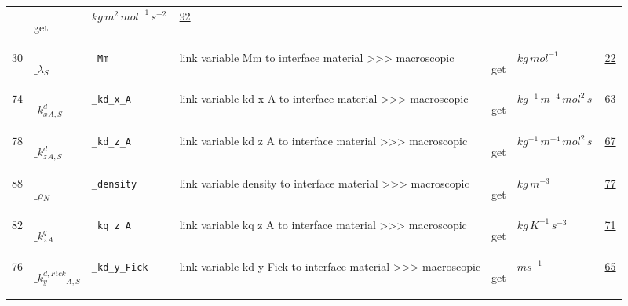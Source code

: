 \begin{longtable}{|p{1cm}|p{2.5cm}|p{4.5cm}|p{8cm}|p{3.0cm}|p{3cm}|p{1cm}|}
             & \begin{lay}get \end{lay}
             & $ kg \,m^{2} \,mol^{-1} \,s^{-2} \, $
             &                 \hyperlink{"e:92"}{ 92 }
                 \\
            30
             & \hypertarget{"v:30"}{ $ {{\_\lambda}}{_{S}} $}
             & \verb|_Mm|
             & link variable Mm to interface material >>> macroscopic
             & \begin{lay}get \end{lay}
             & $ kg \,mol^{-1} \, $
             &                 \hyperlink{"e:22"}{ 22 }
                 \\
            74
             & \hypertarget{"v:74"}{ $ {{\_k^d_x}}{_{A, S}} $}
             & \verb|_kd_x_A|
             & link variable kd x A to interface material >>> macroscopic
             & \begin{lay}get \end{lay}
             & $ kg^{-1} \,m^{-4} \,mol^{2} \,s \, $
             &                 \hyperlink{"e:63"}{ 63 }
                 \\
            78
             & \hypertarget{"v:78"}{ $ {{\_k^d_z}}{_{A, S}} $}
             & \verb|_kd_z_A|
             & link variable kd z A to interface material >>> macroscopic
             & \begin{lay}get \end{lay}
             & $ kg^{-1} \,m^{-4} \,mol^{2} \,s \, $
             &                 \hyperlink{"e:67"}{ 67 }
                 \\
            88
             & \hypertarget{"v:88"}{ $ {{\_\rho}}{_{N}} $}
             & \verb|_density|
             & link variable density to interface material >>> macroscopic
             & \begin{lay}get \end{lay}
             & $ kg \,m^{-3} \, $
             &                 \hyperlink{"e:77"}{ 77 }
                 \\
            82
             & \hypertarget{"v:82"}{ $ {{\_k^q_z}}{_{A}} $}
             & \verb|_kq_z_A|
             & link variable kq z A to interface material >>> macroscopic
             & \begin{lay}get \end{lay}
             & $ kg \,K^{-1} \,s^{-3} \, $
             &                 \hyperlink{"e:71"}{ 71 }
                 \\
            76
             & \hypertarget{"v:76"}{ $ {{\_k^{d,Fick}_y}}{_{A, S}} $}
             & \verb|_kd_y_Fick|
             & link variable kd y Fick to interface material >>> macroscopic
             & \begin{lay}get \end{lay}
             & $ m s^{-1} \, $
             &                 \hyperlink{"e:65"}{ 65 }
                 \\
    \end{longtable}